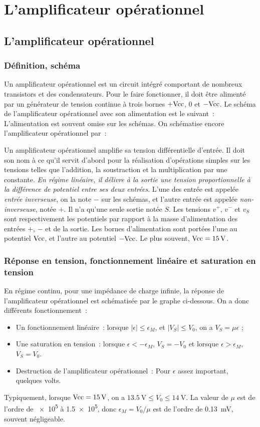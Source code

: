 \chapter{L'amplificateur opérationnel}
\minitoc
\minilof
\minilot
%
\section{L'amplificateur opérationnel}
\subsection{Définition, schéma}
Un amplificateur opérationnel est un circuit intégré comportant de nombreux transistors et des condensateurs. Pour le faire fonctionner, il doit être alimenté par un générateur de tension continue à trois bornes \(+\textrm{Vcc}\), \(0\) et \(-\textrm{Vcc}\). Le schéma de l'amplificateur opérationnel avec son alimentation est le suivant~:
L'alimentation est souvent omise sur les schémas. On schématise encore l'amplificateur opérationnel par~:

Un amplificateur opérationnel amplifie sa tension différentielle d'entrée. Il doit son nom à ce qu'il servit d'abord pour la réalisation d'opérations simples sur les tensions telles que l'addition, la soustraction et la multiplication par une constante. \emph{En régime linéaire, il délivre à la sortie une tension proportionnelle à la différence de potentiel entre ses deux entrées}. L'une des entrée est appelée \emph{entrée inverseuse}, on la note \(-\) sur les schémas, et l'autre entrée est appelée \emph{non-inverseuse}, notée \(+\). Il n'a qu'une seule sortie notée \(S\). Les tensions \(v^+\), \(v^-\) et \(v_S\) sont respectivement les potentiels par rapport à la masse d'alimentation des entrées \(+\), \(-\) et de la sortie. Les bornes d'alimentation sont portées l'une au potentiel \(\textrm{Vcc}\), et l'autre au potentiel \(-\textrm{Vcc}\). Le plus souvent, \(\textrm{Vcc} = \SI{15}{\volt}\).
\subsection{Réponse en tension, fonctionnement linéaire et saturation en tension}
En régime continu, pour une impédance de charge infinie, la réponse de l'amplificateur opérationnel est schématisée par le graphe ci-dessous.%
On a donc différents fonctionnement~:
\begin{itemize}
	\item Un fonctionnement linéaire~: lorsque \(\mid \epsilon \mid \leq \epsilon_M\), et \(\mid V_S \mid \leq V_0\), on a \(V_S = \mu \epsilon\) ;
	\item Une saturation en tension~: lorsque \(\epsilon < -\epsilon_M\), \(V_S = -V_0\) et lorsque \(\epsilon > \epsilon_M\), \(V_S = V_0\).
	\item Destruction de l'amplificateur opérationnel~: Pour \(\epsilon\) assez important, quelques volts.
\end{itemize}
Typiquement, lorsque \(\textrm{Vcc} = \SI{15}{\volt}\), on a \(\SI{13.5}{\volt} \leq V_0 \leq \SI{14}{\volt}\). La valeur de \(\mu\) est de l'ordre de \num{e5} à \num{1.5e5}, donc \(\epsilon_M = V_0/\mu\) est de l'ordre de \SI{0.13}{\milli\volt}, souvent négligeable.

